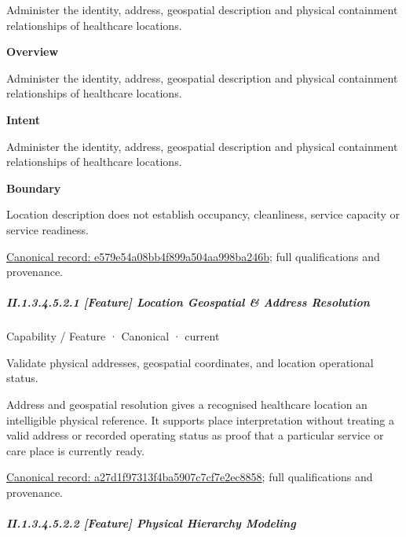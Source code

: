 Administer the identity, address, geospatial description and physical containment relationships of healthcare locations.



\textbf{Overview}



Administer the identity, address, geospatial description and physical containment relationships of healthcare locations.



\textbf{Intent}



Administer the identity, address, geospatial description and physical containment relationships of healthcare locations.



\textbf{Boundary}



Location description does not establish occupancy, cleanliness, service capacity or service readiness.


{\footnotesize \href{../../../../continuum/strategy/capability/e579e54a08bb4f899a504aa998ba246b.md}{Canonical record: e579e54a08bb4f899a504aa998ba246b}; full qualifications and provenance.}\par
\subparagraph*{II.1.3.4.5.2.1 [Feature] Location Geospatial \& Address Resolution}
\label{navigation:II.1.3.4.5.2.1}

\label{element:a27d1f97313f4ba5907c7cf7e2ec8858}
{\small Capability / Feature · Canonical · current}\par

Validate physical addresses, geospatial coordinates, and location operational status.



Address and geospatial resolution gives a recognised healthcare location an intelligible physical reference. It supports place interpretation without treating a valid address or recorded operating status as proof that a particular service or care place is currently ready.


{\footnotesize \href{../../../../continuum/strategy/capability/feature/a27d1f97313f4ba5907c7cf7e2ec8858.md}{Canonical record: a27d1f97313f4ba5907c7cf7e2ec8858}; full qualifications and provenance.}\par
\subparagraph*{II.1.3.4.5.2.2 [Feature] Physical Hierarchy Modeling}
\label{navigation:II.1.3.4.5.2.2}

